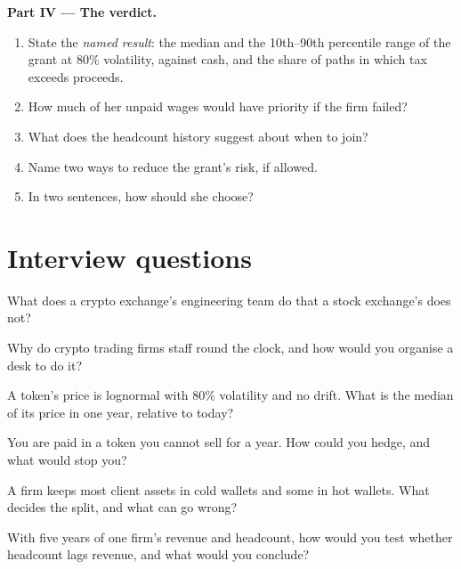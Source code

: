 \begin{problem}
\medskip\noindent\textbf{Part IV --- The verdict.}
\begin{enumerate}[resume]
\item State the \emph{named result}: the median and the 10th--90th percentile range of the grant at 80\% volatility,
against cash, and the share of paths in which tax exceeds proceeds.
\item How much of her unpaid wages would have priority if the firm failed?
\item What does the headcount history suggest about when to join?
\item Name two ways to reduce the grant's risk, if allowed.
\item In two sentences, how should she choose?
\end{enumerate}
\end{problem}

\section{Interview questions}

\begin{interviewq}\label{iq:in:crypto-native-firms:1}
What does a crypto exchange's engineering team do that a stock exchange's does not?
\end{interviewq}

\begin{interviewq}\label{iq:in:crypto-native-firms:2}
Why do crypto trading firms staff round the clock, and how would you organise a desk to do it?
\end{interviewq}

\begin{interviewq}\label{iq:in:crypto-native-firms:3}
A token's price is lognormal with 80\% volatility and no drift. What is the median of its price in one year, relative to
today?
\end{interviewq}

\begin{interviewq}\label{iq:in:crypto-native-firms:4}
You are paid in a token you cannot sell for a year. How could you hedge, and what would stop you?
\end{interviewq}

\begin{interviewq}\label{iq:in:crypto-native-firms:5}
A firm keeps most client assets in cold wallets and some in hot wallets. What decides the split, and what can go wrong?
\end{interviewq}

\begin{interviewq}\label{iq:in:crypto-native-firms:6}
With five years of one firm's revenue and headcount, how would you test whether headcount lags revenue, and what would
you conclude?
\end{interviewq}
